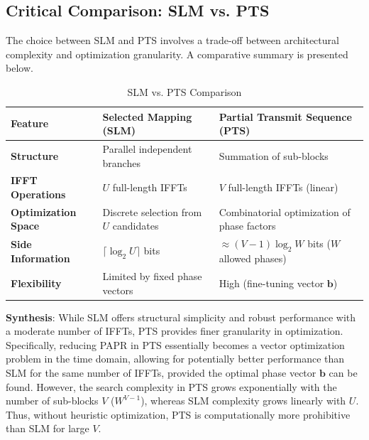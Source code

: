 \documentclass[conference]{IEEEtran}
\begin{document}
\subsection{Critical Comparison: SLM vs. PTS}
The choice between SLM and PTS involves a trade-off between architectural complexity and optimization granularity. A comparative summary is presented below.

\begin{table}[htbp]
    \caption{SLM vs. PTS Comparison}
    \begin{center}
        \begin{tabular}{|l|p{3cm}|p{3cm}|}
            \hline
            \textbf{Feature}            & \textbf{Selected Mapping (SLM)}        & \textbf{Partial Transmit Sequence (PTS)}          \\ \hline
            \textbf{Structure}          & Parallel independent branches          & Summation of sub-blocks                           \\ \hline
            \textbf{IFFT Operations}    & $U$ full-length IFFTs                  & $V$ full-length IFFTs (linear)                    \\ \hline
            \textbf{Optimization Space} & Discrete selection from $U$ candidates & Combinatorial optimization of phase factors       \\ \hline
            \textbf{Side Information}   & $\lceil \log_2 U \rceil$ bits          & $\approx (V-1)\log_2 W$ bits ($W$ allowed phases) \\ \hline
            \textbf{Flexibility}        & Limited by fixed phase vectors         & High (fine-tuning vector $\mathbf{b}$)            \\ \hline
        \end{tabular}
        \label{tab1}
    \end{center}
\end{table}

\textbf{Synthesis}: While SLM offers structural simplicity and robust performance with a moderate number of IFFTs, PTS provides finer granularity in optimization. Specifically, reducing PAPR in PTS essentially becomes a vector optimization problem in the time domain, allowing for potentially better performance than SLM for the same number of IFFTs, provided the optimal phase vector $\mathbf{b}$ can be found. However, the search complexity in PTS grows exponentially with the number of sub-blocks $V$ ($W^{V-1}$), whereas SLM complexity grows linearly with $U$. Thus, without heuristic optimization, PTS is computationally more prohibitive than SLM for large $V$.
\end{document}
